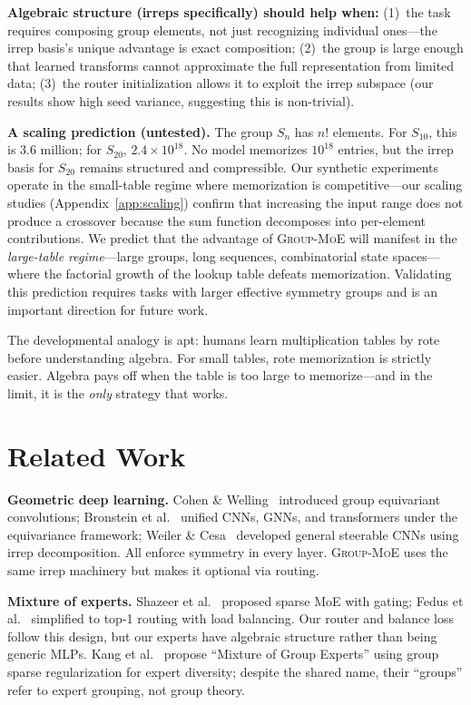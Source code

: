 \documentclass[10pt, letterpaper]{article}
\newcommand{\gmoe}{\textsc{Group-MoE}}
\begin{document}
\textbf{Algebraic structure (irreps specifically) should help when:} (1)~the task requires composing group elements, not just recognizing individual ones---the irrep basis's unique advantage is exact composition; (2)~the group is large enough that learned transforms cannot approximate the full representation from limited data; (3)~the router initialization allows it to exploit the irrep subspace (our results show high seed variance, suggesting this is non-trivial).

\textbf{A scaling prediction (untested).} The group $S_n$ has $n!$ elements. For $S_{10}$, this is 3.6 million; for $S_{20}$, $2.4 \times 10^{18}$. No model memorizes $10^{18}$ entries, but the irrep basis for $S_{20}$ remains structured and compressible. Our synthetic experiments operate in the small-table regime where memorization is competitive---our scaling studies (Appendix~\ref{app:scaling}) confirm that increasing the input range does not produce a crossover because the sum function decomposes into per-element contributions. We predict that the advantage of \gmoe{} will manifest in the \emph{large-table regime}---large groups, long sequences, combinatorial state spaces---where the factorial growth of the lookup table defeats memorization. Validating this prediction requires tasks with larger effective symmetry groups and is an important direction for future work.

The developmental analogy is apt: humans learn multiplication tables by rote before understanding algebra. For small tables, rote memorization is strictly easier. Algebra pays off when the table is too large to memorize---and in the limit, it is the \emph{only} strategy that works.

\section{Related Work}
\label{sec:related}

\textbf{Geometric deep learning.} Cohen \& Welling~\cite{cohen2016group} introduced group equivariant convolutions; Bronstein et al.~\cite{bronstein2021geometric} unified CNNs, GNNs, and transformers under the equivariance framework; Weiler \& Cesa~\cite{weiler2019general} developed general steerable CNNs using irrep decomposition. All enforce symmetry in every layer. \gmoe{} uses the same irrep machinery but makes it optional via routing.

\textbf{Mixture of experts.} Shazeer et al.~\cite{shazeer2017outrageously} proposed sparse MoE with gating; Fedus et al.~\cite{fedus2022switch} simplified to top-1 routing with load balancing. Our router and balance loss follow this design, but our experts have algebraic structure rather than being generic MLPs. Kang et al.~\cite{kang2025mixture} propose ``Mixture of Group Experts'' using group sparse regularization for expert diversity; despite the shared name, their ``groups'' refer to expert grouping, not group theory.
\end{document}
